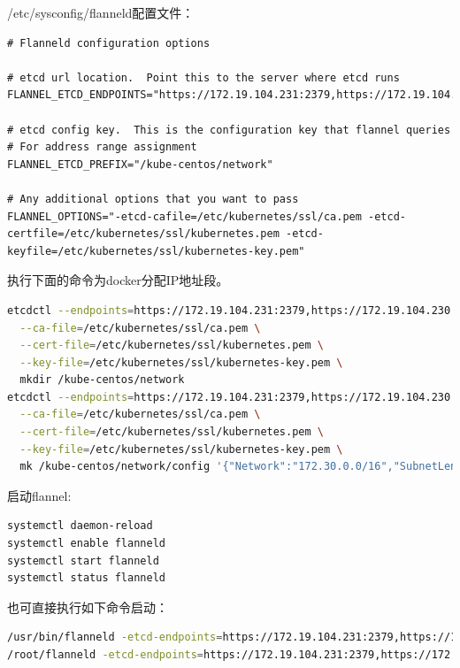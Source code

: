 \documentclass[8pt]{book}
\numberwithin{dummy}{section}
\theoremstyle{ocrenumbox}
\theoremstyle{blacknumex}
\theoremstyle{blacknumbox}
\theoremstyle{ocrenum}
\begin{document}
/etc/sysconfig/flanneld配置文件：

\begin{lstlisting}
# Flanneld configuration options  

# etcd url location.  Point this to the server where etcd runs
FLANNEL_ETCD_ENDPOINTS="https://172.19.104.231:2379,https://172.19.104.230:2379,https://172.19.150.82:2379"

# etcd config key.  This is the configuration key that flannel queries
# For address range assignment
FLANNEL_ETCD_PREFIX="/kube-centos/network"

# Any additional options that you want to pass
FLANNEL_OPTIONS="-etcd-cafile=/etc/kubernetes/ssl/ca.pem -etcd-certfile=/etc/kubernetes/ssl/kubernetes.pem -etcd-keyfile=/etc/kubernetes/ssl/kubernetes-key.pem"
\end{lstlisting}

执行下面的命令为docker分配IP地址段。

\begin{lstlisting}[language=Bash]
etcdctl --endpoints=https://172.19.104.231:2379,https://172.19.104.230:2379,https://172.19.150.82:2379 \
  --ca-file=/etc/kubernetes/ssl/ca.pem \
  --cert-file=/etc/kubernetes/ssl/kubernetes.pem \
  --key-file=/etc/kubernetes/ssl/kubernetes-key.pem \
  mkdir /kube-centos/network
etcdctl --endpoints=https://172.19.104.231:2379,https://172.19.104.230:2379,https://172.19.150.82:2379 \
  --ca-file=/etc/kubernetes/ssl/ca.pem \
  --cert-file=/etc/kubernetes/ssl/kubernetes.pem \
  --key-file=/etc/kubernetes/ssl/kubernetes-key.pem \
  mk /kube-centos/network/config '{"Network":"172.30.0.0/16","SubnetLen":24,"Backend":{"Type":"vxlan"}}'
\end{lstlisting}

启动flannel:

\begin{lstlisting}[language=Bash]
systemctl daemon-reload
systemctl enable flanneld
systemctl start flanneld
systemctl status flanneld
\end{lstlisting}

也可直接执行如下命令启动：

\begin{lstlisting}[language=Bash]
/usr/bin/flanneld -etcd-endpoints=https://172.19.104.231:2379,https://172.19.104.230:2379,https://172.19.150.82:2379 -etcd-prefix=/kube-centos/network -etcd-cafile=/etc/kubernetes/ssl/ca.pem -etcd-certfile=/etc/kubernetes/ssl/kubernetes.pem -etcd-keyfile=/etc/kubernetes/ssl/kubernetes-key.pem
/root/flanneld -etcd-endpoints=https://172.19.104.231:2379,https://172.19.104.230:2379,https://172.19.150.82:2379 -etcd-prefix=/kube-centos/network -etcd-cafile=/etc/kubernetes/ssl/ca.pem -etcd-certfile=/etc/kubernetes/ssl/kubernetes.pem -etcd-keyfile=/etc/kubernetes/ssl/kubernetes-key.pem
\end{lstlisting}
\end{document}
